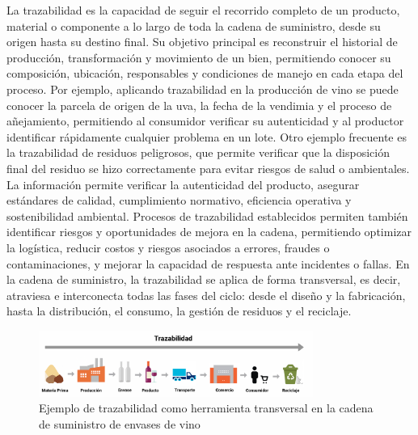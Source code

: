 La trazabilidad es la capacidad de seguir el recorrido completo de un producto, material o componente a lo largo de toda la cadena de suministro, desde su origen hasta su destino final. Su objetivo principal es reconstruir el historial de producción, transformación y movimiento de un bien, permitiendo conocer su composición, ubicación, responsables y condiciones de manejo en cada etapa del proceso. Por ejemplo, aplicando trazabilidad en la producción de vino se puede conocer la parcela de origen de la uva, la fecha de la vendimia y el proceso de añejamiento, permitiendo al consumidor verificar su autenticidad y al productor identificar rápidamente cualquier problema en un lote. Otro ejemplo frecuente es la trazabilidad de residuos peligrosos, que permite verificar que la disposición final del residuo se hizo correctamente para evitar riesgos de salud o ambientales. La información permite verificar la autenticidad del producto, asegurar estándares de calidad, cumplimiento normativo, eficiencia operativa y sostenibilidad ambiental. Procesos de trazabilidad establecidos permiten también identificar riesgos y oportunidades de mejora en la cadena, permitiendo optimizar la logística, reducir costos y riesgos asociados a errores, fraudes o contaminaciones, y mejorar la capacidad de respuesta ante incidentes o fallas. En la cadena de suministro, la trazabilidad se aplica de forma transversal, es decir, atraviesa e interconecta todas las fases del ciclo: desde el diseño y la fabricación, hasta la distribución, el consumo, la gestión de residuos y el reciclaje.

\begin{figure}[!tb]
    \centering
    \includegraphics[width=0.8\textwidth]{Figures/supply-chain-traceability.png}
    \caption{Ejemplo de trazabilidad como herramienta transversal en la cadena de suministro de envases de vino}
    \label{fig:supply-chain-traceability}
\end{figure}

